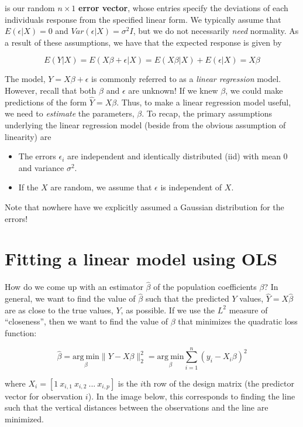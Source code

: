 is our random $n \times 1$ {\bf error vector}, whose entries specify the deviations of each individuals response from the specified linear form. We typically assume that $E(\epsilon | X) = 0$ and $Var(\epsilon | X) = \sigma^2 I$, but we do not necessarily \emph{need} normality. As a result of these assumptions, we have that the expected response is given by

$$E(Y | X) = E(X \beta + \epsilon | X) = E(X \beta| X) + E(\epsilon | X) = X \beta$$

The model, $Y = X \beta + \epsilon$ is commonly referred to as a \textit{linear regression} model. However, recall that both $\beta$ and $\epsilon$ are unknown! If we knew $\beta$, we could make predictions of the form $\hat{Y} = X\beta$. Thus, to make a linear regression model useful, we need to \textit{estimate} the parameters, $\beta$. To recap, the primary assumptions underlying the linear regression model (beside from the obvious assumption of linearity) are


\begin{itemize}
\item The errors $\epsilon_i$ are independent and identically distributed (iid) with mean 0 and variance $\sigma^2$.
\item If the $X$ are random, we assume that $\epsilon$ is independent of $X$.
\end{itemize}


Note that nowhere have we explicitly assumed a Gaussian distribution for the errors!


\section{Fitting a linear model using OLS}


How do we come up with an estimator $\hat{\beta}$ of the population coefficients $\beta$? In general, we want to find the value of $\hat{\beta}$ such that the predicted $Y$ values, $\hat{Y} = X \hat{\beta}$ are as close to the true values, $Y$, as possible. If we use the $L^2$ measure of ``closeness'', then we want to find the value of $\beta$ that minimizes the quadratic loss function:

$$\hat{\beta} = \underset{\beta}{\text{arg}~\text{min}} \| Y - X \beta\|_2^2 =  \underset{\beta}{\text{arg}~\text{min}} \sum_{i = 1}^n (y_i - X_i \beta)^2$$

where $X_i = [1 ~ x_{i,1}~ x_{i, 2} ~... ~x_{i, p}]$ is the $i$th row of the design matrix (the predictor vector for observation $i$). In the image below, this corresponds to finding the line such that the vertical distances between the observations and the line are minimized.

